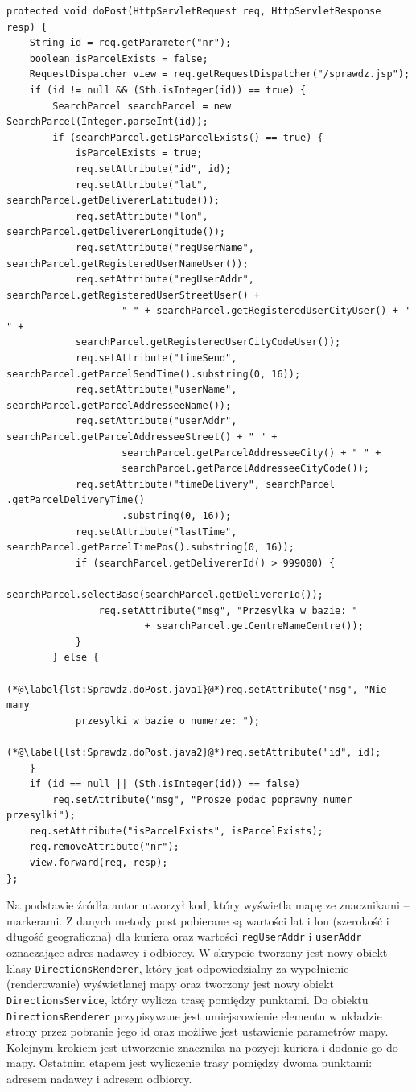 \documentclass[eng,printmode,oneside]{mgr}
\begin{document}
\begin{lstlisting}[caption=Fragment klasy Sprawdz.Java\,
metoda doPost(),label=lst:Sprawdz.doPost.java]
protected void doPost(HttpServletRequest req, HttpServletResponse resp) {
	String id = req.getParameter("nr");
	boolean isParcelExists = false;
	RequestDispatcher view = req.getRequestDispatcher("/sprawdz.jsp");
	if (id != null && (Sth.isInteger(id)) == true) {
		SearchParcel searchParcel = new SearchParcel(Integer.parseInt(id));
		if (searchParcel.getIsParcelExists() == true) {
			isParcelExists = true;
			req.setAttribute("id", id);
			req.setAttribute("lat", searchParcel.getDelivererLatitude());
			req.setAttribute("lon", searchParcel.getDelivererLongitude());
			req.setAttribute("regUserName",	searchParcel.getRegisteredUserNameUser());
			req.setAttribute("regUserAddr",	searchParcel.getRegisteredUserStreetUser() +
					" " + searchParcel.getRegisteredUserCityUser() + " " +
			searchParcel.getRegisteredUserCityCodeUser()); 
			req.setAttribute("timeSend", searchParcel.getParcelSendTime().substring(0, 16));
			req.setAttribute("userName", searchParcel.getParcelAddresseeName());
			req.setAttribute("userAddr", searchParcel.getParcelAddresseeStreet() + " " +
					searchParcel.getParcelAddresseeCity() + " "	+ 
					searchParcel.getParcelAddresseeCityCode());
			req.setAttribute("timeDelivery", searchParcel .getParcelDeliveryTime()
					.substring(0, 16)); 
			req.setAttribute("lastTime", searchParcel.getParcelTimePos().substring(0, 16));
			if (searchParcel.getDelivererId() > 999000) {
				searchParcel.selectBase(searchParcel.getDelivererId());
				req.setAttribute("msg", "Przesylka w bazie: "
						+ searchParcel.getCentreNameCentre());
			}
		} else {
			(*@\label{lst:Sprawdz.doPost.java1}@*)req.setAttribute("msg", "Nie mamy
			przesylki w bazie o numerze: ");
			(*@\label{lst:Sprawdz.doPost.java2}@*)req.setAttribute("id", id); 
	}
	if (id == null || (Sth.isInteger(id)) == false)
		req.setAttribute("msg", "Prosze podac poprawny numer przesylki"); 
	req.setAttribute("isParcelExists", isParcelExists);
	req.removeAttribute("nr");
	view.forward(req, resp);
};
\end{lstlisting}

Na podstawie źródła \cite{developer.google.maps} autor utworzył kod,
który wyświetla mapę ze znacznikami -- markerami. Z danych metody post pobierane
są wartości lat i lon (szerokość i długość geograficzna) dla kuriera oraz wartości
\texttt{regUserAddr} i \texttt{userAddr} oznaczające adres nadawcy i odbiorcy. W
skrypcie tworzony jest nowy obiekt klasy \texttt{DirectionsRenderer}, który jest
odpowiedzialny za wypełnienie (renderowanie) wyświetlanej mapy oraz tworzony
jest nowy obiekt \texttt{DirectionsService}, który wylicza trasę pomiędzy punktami.
Do obiektu \texttt{DirectionsRenderer} przypisywane jest umiejscowienie elementu
w układzie strony przez pobranie jego id oraz możliwe jest ustawienie parametrów mapy.
Kolejnym krokiem jest utworzenie znacznika na pozycji kuriera i dodanie go do
mapy. Ostatnim etapem jest wyliczenie trasy pomiędzy dwoma punktami: adresem
nadawcy i adresem odbiorcy.
\end{document}
